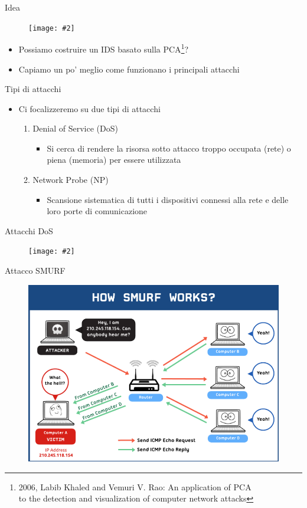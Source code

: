 \documentclass[xcolor={dvipsnames}]{beamer}
\newcommand{\figcen}[2]{
	\begin{figure}
		\begin{center}
			\texttt{[image: \#2]}
		\end{center}
	\end{figure}
}
\begin{document}
		\begin{frame}{Idea}
			\figcen{.3\textwidth}{idea}
			\begin{itemize}
				\item Possiamo costruire un IDS basato sulla PCA\footnote[frame]{2006, Labib Khaled and Vemuri V. Rao: An application of PCA\\ to the detection and visualization of computer network attacks}?
				\item Capiamo un po' meglio come funzionano i principali attacchi
			\end{itemize}
			
		\end{frame}
		
		\begin{frame}{Tipi di attacchi}
			\begin{itemize}
				\item Ci focalizzeremo su due tipi di attacchi
				\begin{enumerate}
					\item Denial of Service (DoS)
					\begin{itemize}
						\item Si cerca di rendere la risorsa sotto attacco troppo occupata (rete) o piena (memoria) per essere utilizzata
					\end{itemize}
						\item Network Probe (NP)
					\begin{itemize}
						\item Scansione sistematica di tutti i dispositivi connessi alla rete e delle loro porte di comunicazione
					\end{itemize}
				\end{enumerate}
			\end{itemize}
		\end{frame}

		\begin{frame}{Attacchi DoS}
			\figcen{.8\textwidth}{dos}
		\end{frame}
		
		\begin{frame}{Attacco SMURF}
			\begin{figure}
				\begin{center}
					\includegraphics[width=.75\textwidth]{smurf}
				\end{center}
			\end{figure}
		\end{frame}
		
\end{document}
